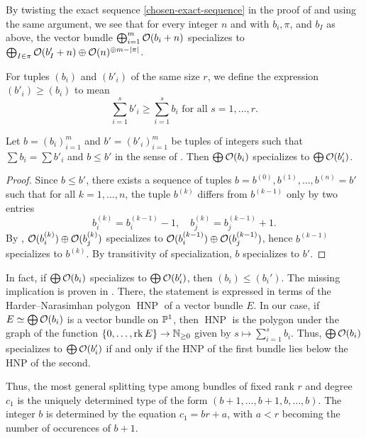 \begin{remark} \label{my-specialization}
	By twisting the exact sequence \cref{chosen-exact-sequence} in the proof of  and using the same argument, we see that for every integer $n$ and with $b_i, \pi$, and $b_I$ as above, the vector bundle $\bigoplus_{i=1}^m \mathcal{O} (b_i+n)$ specializes to $\bigoplus_{I\in\pi} \mathcal{O}(b'_I+n) \oplus \mathcal{O}(n)^{\oplus m-\lvert\pi\rvert}$.
\end{remark}

\begin{definition} \label{def-compare-types}
	For tuples $(b_i)$ and $(b'_i)$ of the same size $r$, we define the expression $(b'_i) \geq (b_i)$ to mean
	\[
		\sum_{i=1}^s b'_i \geq \sum_{i=1}^s b_i \text{ for all $s=1,\dotsc, r$}.
	\]
\end{definition}

\begin{proposition}
	Let $b=(b_i)_{i=1}^m$ and $b'=(b'_i)_{i=1}^m$ be tuples of integers such that $\sum b_i = \sum b'_i$ and $b\leq b'$ in the sense of . Then $\bigoplus \mathcal{O}(b_i)$ specializes to $\bigoplus \mathcal{O}(b'_i)$.
\end{proposition}

\begin{proof}
	Since $b\leq b'$, there exists a sequence of tuples $b=b^{(0)},b^{(1)},\dotsc,b^{(n)}=b'$ such that for all $k=1,\dotsc,n$, the tuple $b^{(k)}$ differs from $b^{(k-1)}$ only by two entries
	\[
		b^{(k)}_i = b^{(k-1)}_i - 1, \quad
		b^{(k)}_j = b^{(k-1)}_j + 1.
	\]
	By , $\mathcal{O}(b^{(k)}_i) \oplus \mathcal{O}(b^{(k)}_j)$ specializes to $\mathcal{O}(b^{(k-1)}_i) \oplus \mathcal{O}(b^{(k-1)}_j)$, hence $b^{(k-1)}$ specializes to $b^{(k)}$. By transitivity of specialization, $b$ specializes to $b'.$
\end{proof}

\newcommand{\HNP}{\operatorname{HNP}}

\begin{remark}
	In fact, if $\bigoplus \mathcal{O}(b_i)$ specializes to $\bigoplus \mathcal{O}(b_i')$, then $(b_i)\leq (b_i')$. The missing implication is proven \eg in \cite[Thm.\ 3]{schatz-degeneration-specialization}. There, the statement is expressed in terms of the Harder–Narasimhan polygon $\HNP$ of a vector bundle $E$. In our case, if $E\simeq \bigoplus \mathcal{O}(b_i)$ is a vector bundle on $\mathbb{P}^1$, then $\HNP$ is the polygon under the graph of the function $\{0,\dotsc,\operatorname{rk} E\}\to \mathbb{N}_{\geq 0}$ given by $s\mapsto \sum_{i=1}^s b_i$. Thus, $\bigoplus \mathcal{O}(b_i)$ specializes to $\bigoplus \mathcal{O}(b_i')$ if and only if the HNP of the first bundle lies below the HNP of the second.

	Thus, the most general splitting type among bundles of fixed rank $r$ and degree $c_1$ is the uniquely determined type 
    of the form
	$(b + 1,\dotsc,b + 1,b,\dotsc,b)$. The integer $b$ is determined by the equation
	$c_1 = b r + a$, with $a < r$ becoming the number of occurences of $b +1$.
\end{remark}